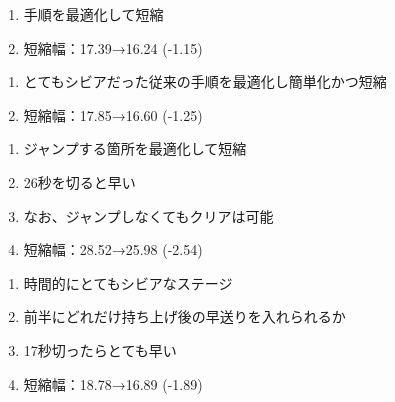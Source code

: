 \begin{enumerate}[label={\sarrow}]
\item 手順を最適化して短縮
\item 短縮幅：17.39→16.24 (-1.15)
\end{enumerate}



\begin{enumerate}[label={\sarrow}]
\item とてもシビアだった従来の手順を最適化し簡単化かつ短縮
\item 短縮幅：17.85→16.60 (-1.25)
\end{enumerate}



\begin{enumerate}[label={\sarrow}]
\item ジャンプする箇所を最適化して短縮
\item 26秒を切ると早い
\item なお、ジャンプしなくてもクリアは可能
\item 短縮幅：28.52→25.98 (-2.54)
\end{enumerate}



\clearpage
\begin{enumerate}[label={\sarrow}]
\item 時間的にとてもシビアなステージ
\item 前半にどれだけ持ち上げ後の早送りを入れられるか
\item 17秒切ったらとても早い
\item 短縮幅：18.78→16.89 (-1.89)
\end{enumerate}



